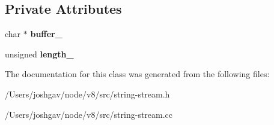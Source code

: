\subsection*{Private Attributes}
\begin{DoxyCompactItemize}
\item 
char $\ast$ {\bfseries buffer\+\_\+}\hypertarget{classv8_1_1internal_1_1_fixed_string_allocator_a740443f77abcc85680078e7502fc25d2}{}\label{classv8_1_1internal_1_1_fixed_string_allocator_a740443f77abcc85680078e7502fc25d2}

\item 
unsigned {\bfseries length\+\_\+}\hypertarget{classv8_1_1internal_1_1_fixed_string_allocator_aa7d81c82497cfb69de68ec4e3518b5cf}{}\label{classv8_1_1internal_1_1_fixed_string_allocator_aa7d81c82497cfb69de68ec4e3518b5cf}

\end{DoxyCompactItemize}


The documentation for this class was generated from the following files\+:\begin{DoxyCompactItemize}
\item 
/\+Users/joshgav/node/v8/src/string-\/stream.\+h\item 
/\+Users/joshgav/node/v8/src/string-\/stream.\+cc\end{DoxyCompactItemize}
